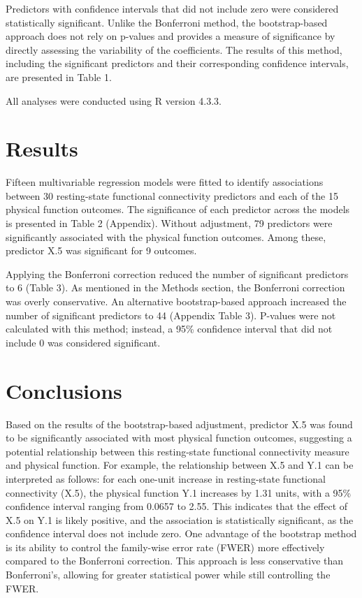 \documentclass[
  12pt,
]{article}
\begin{document}
Predictors with confidence intervals that did not include zero were
considered statistically significant. Unlike the Bonferroni method, the
bootstrap-based approach does not rely on p-values and provides a
measure of significance by directly assessing the variability of the
coefficients. The results of this method, including the significant
predictors and their corresponding confidence intervals, are presented
in Table 1.

All analyses were conducted using R version 4.3.3.

\hypertarget{results}{%
\section{Results}\label{results}}

Fifteen multivariable regression models were fitted to identify
associations between 30 resting-state functional connectivity predictors
and each of the 15 physical function outcomes. The significance of each
predictor across the models is presented in Table 2 (Appendix). Without
adjustment, 79 predictors were significantly associated with the
physical function outcomes. Among these, predictor X.5 was significant
for 9 outcomes.

Applying the Bonferroni correction reduced the number of significant
predictors to 6 (Table 3). As mentioned in the Methods section, the
Bonferroni correction was overly conservative. An alternative
bootstrap-based approach increased the number of significant predictors
to 44 (Appendix Table 3). P-values were not calculated with this method;
instead, a 95\% confidence interval that did not include 0 was
considered significant.

\hypertarget{conclusions}{%
\section{Conclusions}\label{conclusions}}

Based on the results of the bootstrap-based adjustment, predictor X.5
was found to be significantly associated with most physical function
outcomes, suggesting a potential relationship between this resting-state
functional connectivity measure and physical function. For example, the
relationship between X.5 and Y.1 can be interpreted as follows: for each
one-unit increase in resting-state functional connectivity (X.5), the
physical function Y.1 increases by 1.31 units, with a 95\% confidence
interval ranging from 0.0657 to 2.55. This indicates that the effect of
X.5 on Y.1 is likely positive, and the association is statistically
significant, as the confidence interval does not include zero. One
advantage of the bootstrap method is its ability to control the
family-wise error rate (FWER) more effectively compared to the
Bonferroni correction. This approach is less conservative than
Bonferroni's, allowing for greater statistical power while still
controlling the FWER.
\end{document}

